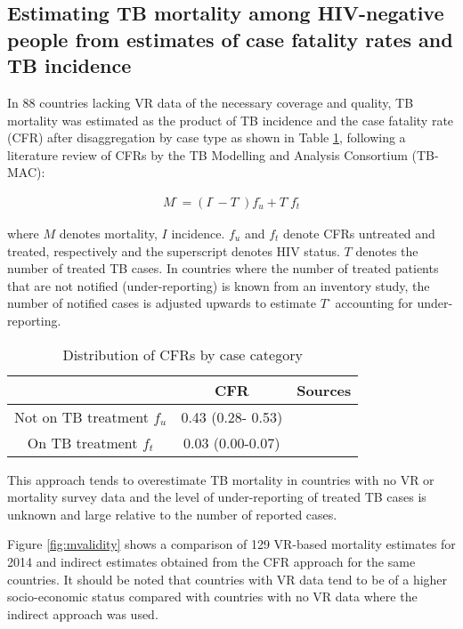\subsection{Estimating TB mortality among HIV-negative people from estimates of case fatality rates and TB incidence
}

In 88 countries lacking VR data of the necessary coverage and quality, TB mortality was estimated as the product of TB incidence and the case fatality rate (CFR) after disaggregation by case type as shown in Table \ref{tab:cfr}, following a literature review of CFRs by the TB Modelling and Analysis Consortium (TB-MAC):

\begin{align*}
M^{\textrm{-}} = (I^{\textrm{-}} -T^{\textrm{-}})f_u^{\textrm{-}} + T^{\textrm{-}}f_t^{\textrm{-}} 
\end{align*}

where $M$ denotes mortality, $I$ incidence. $f_u$ and $f_t$ denote CFRs untreated and treated, respectively and the superscript denotes HIV status. $T$ denotes the number of treated TB cases. In countries where the number of treated patients that are not notified (under-reporting) is known from an inventory study, the number of notified cases is adjusted upwards to estimate $T^{\textrm{-}}$ accounting for under-reporting. 

\begin{table} 
    \begin{tabular}{ c c c }
    \hline
         & CFR & Sources \\ 
         \hline
        Not on TB treatment $f_u$ & 0.43 (0.28- 0.53) &  \cite{12742798} \cite{21483732} \\ 
        On TB treatment $f_t$ & 0.03 (0.00-0.07) &  \cite{21738585} \\ 
        \hline
    \end{tabular} 
    \caption{Distribution of CFRs by case category} 
    \label{tab:cfr}
\end{table}

This approach tends to overestimate TB mortality in countries with no VR or mortality survey data and the level of under-reporting of treated TB cases is unknown and large relative to the number of reported cases. 

Figure \ref{fig:mvalidity} shows a comparison of 129 VR-based mortality estimates for 2014 and indirect estimates obtained from the CFR approach for the same countries. It should be noted that countries with VR data tend to be of a higher socio-economic status compared with countries with no VR data where the indirect approach was used.


